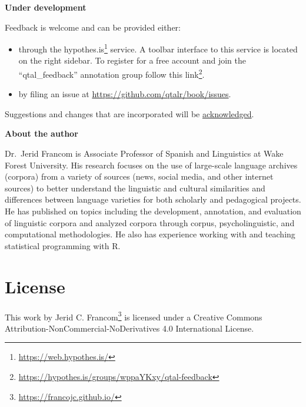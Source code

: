 \documentclass[
  letterpaper,
]{latex/krantz}
\providecommand{\tightlist}{%
  \setlength{\itemsep}{0pt}\setlength{\parskip}{0pt}}\usepackage{longtable,booktabs,array}
\DeclareRobustCommand{\href}[2]{#2\footnote{\url{#1}}}
\begin{document}
\begin{tcolorbox}[enhanced jigsaw, left=2mm, arc=.35mm, colback=white, rightrule=.15mm, toprule=.15mm, breakable, leftrule=.75mm, opacityback=0, bottomrule=.15mm]

\textbf{ Under development}\vspace{2mm}

Feedback is welcome and can be provided either:

\begin{itemize}
\tightlist
\item
  through the \href{https://web.hypothes.is/}{hypothes.is} service. A
  toolbar interface to this service is located on the right sidebar. To
  register for a free account and join the ``qtal\_feedback'' annotation
  group \href{https://hypothes.is/groups/wppaYKxy/qtal-feedback}{follow
  this link}.
\item
  by filing an issue at \url{https://github.com/qtalr/book/issues}.
\end{itemize}

Suggestions and changes that are incorporated will be
\protect\hyperlink{acknowledgements}{acknowledged}.

\end{tcolorbox}

\textbf{About the author}

Dr.~Jerid Francom is Associate Professor of Spanish and Linguistics at
Wake Forest University. His research focuses on the use of large-scale
language archives (corpora) from a variety of sources (news, social
media, and other internet sources) to better understand the linguistic
and cultural similarities and differences between language varieties for
both scholarly and pedagogical projects. He has published on topics
including the development, annotation, and evaluation of linguistic
corpora and analyzed corpora through corpus, psycholinguistic, and
computational methodologies. He also has experience working with and
teaching statistical programming with R.

\hypertarget{license}{%
\section*{License}\label{license}}


This work by \href{https://francojc.github.io/}{Jerid C. Francom} is
licensed under a Creative Commons
Attribution-NonCommercial-NoDerivatives 4.0 International License.
\end{document}
